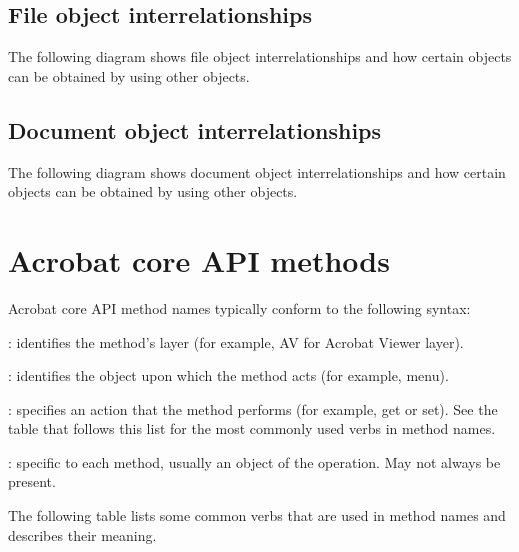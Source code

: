 \documentclass[letterpaper,12pt,english,openany,oneside]{sphinxmanual}
\begin{document}
\subsection{File object interrelationships}
\label{\detokenize{index:file-object-interrelationships}}
The following diagram shows file object interrelationships and how certain objects can be obtained by using other objects.

\noindent{}


\subsection{Document object interrelationships}
\label{\detokenize{index:document-object-interrelationships}}
The following diagram shows document object interrelationships and how certain objects can be obtained by using other objects.

\noindent{}


\section{Acrobat core API methods}
\label{\detokenize{index:acrobat-core-api-methods}}
Acrobat core API method names typically conform to the following syntax:

\begin{sphinxVerbatim}[commandchars=\\\{\}]
\end{sphinxVerbatim}

: identifies the method’s layer (for example, AV for Acrobat Viewer layer).

: identifies the object upon which the method acts (for example, menu).

: specifies an action that the method performs (for example, get or set). See the table that follows this list for the most commonly used verbs in method names.

: specific to each method, usually an object of the operation. May not always be present.

The following table lists some common verbs that are used in method names and describes their meaning.
\end{document}
